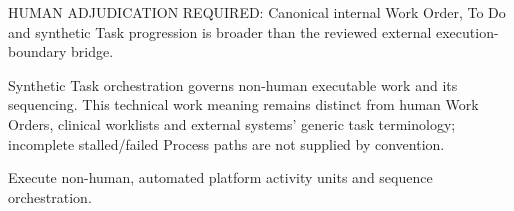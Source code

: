 HUMAN ADJUDICATION REQUIRED: Canonical internal Work Order, To Do and synthetic Task progression is broader than the reviewed external execution-boundary bridge.



Synthetic Task orchestration governs non-human executable work and its sequencing. This technical work meaning remains distinct from human Work Orders, clinical worklists and external systems' generic task terminology; incomplete stalled/\allowbreak{}failed Process paths are not supplied by convention.



Execute non-human, automated platform activity units and sequence orchestration.


